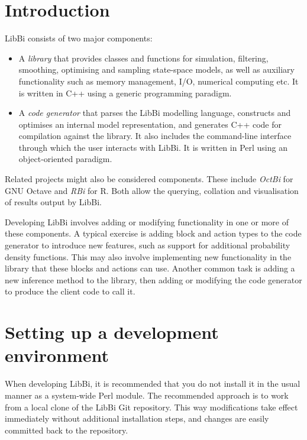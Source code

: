 \section{Introduction}

LibBi consists of two major components:
\begin{itemize}
\item A \emph{library} that provides classes and functions for simulation,
  filtering, smoothing, optimising and sampling state-space models, as well as
  auxiliary functionality such as memory management, I/O, numerical computing
  etc. It is written in C++ using a generic programming paradigm.
\item A \emph{code generator} that parses the LibBi modelling language,
  constructs and optimises an internal model representation, and generates C++
  code for compilation against the library. It also includes the command-line
  interface through which the user interacts with LibBi. It is written in Perl
  using an object-oriented paradigm.
\end{itemize}

Related projects might also be considered components. These include
\emph{OctBi} for GNU Octave and \emph{RBi} for R. Both allow the querying,
collation and visualisation of results output by LibBi.

Developing LibBi involves adding or modifying functionality in one or more of
these components. A typical exercise is adding block and
action types to the code generator to introduce new features, such as support
for additional probability density functions. This
may also involve implementing new functionality in the library that these
blocks and actions can use. Another common task is adding a new inference
method to the library, then adding or modifying the code generator to produce
the client code to call it.

\section{Setting up a development environment}

When developing LibBi, it is recommended that you do not install it in the
usual manner as a system-wide Perl module. The recommended approach is to work
from a local clone of the LibBi Git repository. This way modifications take
effect immediately without additional installation steps, and changes are
easily committed back to the repository.


